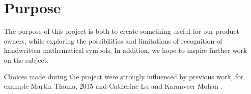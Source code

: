 
\section{Purpose}
The purpose of this project is both to create something useful for our product owners, while exploring the possibilities and limitations of recognition of handwritten mathematical symbols. In addition, we hope to inspire further work on the subject. 

Choices made during the project were strongly influenced by previous work, for example Martin Thoma, 2015 \cite{thoma_-line_2015} and Catherine Lu and Karanveer Mohan \cite{lu_recognition_2015}.

